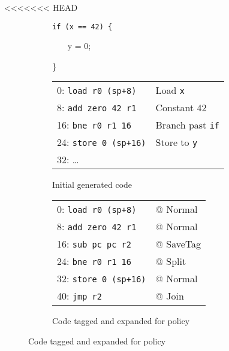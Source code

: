 \documentclass{report}
\begin{document}
<<<<<<< HEAD
\begin{figure}
  \begin{subfigure}[t]{0.18\textwidth}
    \vspace{0em}
    {\tt if (x == 42) \{

      ~~~ y = 0;

      \}
    }
  \end{subfigure}
  \begin{subfigure}[t]{0.42\textwidth}
    \vspace{0em}
    \begin{tabular}{l l}
      0: {\tt load r0 (sp+8)} & Load {\tt x} \\
      8: {\tt add zero 42 r1} & Constant 42 \\
      16: {\tt bne r0 r1 16} & Branch past {\tt if} \\
      24: {\tt store 0 (sp+16)} & Store to {\tt y} \\
      32: \dots & \\
    \end{tabular}
    \caption{Initial generated code}
    \label{ex:if1}
  \end{subfigure}
  \begin{subfigure}[t]{0.4\textwidth}
     \vspace{0em}
     \begin{tabular}{l l}
      0: {\tt load r0 (sp+8)} & @ {\sc Normal} \\
      8: {\tt add zero 42 r1} & @ {\sc Normal} \\
      16: {\tt sub pc pc r2} & @ {\sc SaveTag} \\
      24: {\tt bne r0 r1 16} & @ {\sc Split} \\
      32: {\tt store 0 (sp+16)} & @ {\sc Normal} \\
      40: {\tt jmp r2} & @ {\sc Join} \\
    \end{tabular}
    \caption{Code tagged and expanded for policy}
    \label{ex:if2}
  \end{subfigure}

  \vspace{\belowdisplayskip}
  

\end{figure}
\end{document}
